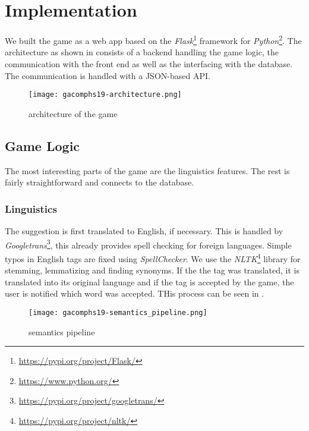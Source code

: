 \section{Implementation}
\label{gacomphs19:sec:implementation}

We built the game as a web app based on the \textit{Flask}\footnote{\url{https://pypi.org/project/Flask/}} framework for \textit{Python}\footnote{\url{https://www.python.org/}}. The architecture as shown in  consists of a backend handling the game logic, the communication with the front end as well as the interfacing with the database. The communication is handled with a JSON-based API.

\begin{figure}[!]
	\centering
	\texttt{[image: gacomphs19-architecture.png]}
	\caption{architecture of the game}
	\label{gacomphs19:fig:architecture}
\end{figure}

\subsection{Game Logic}
\label{gacomphs19:sec:implementation:game}

The most interesting parts of the game are the linguistics features. The rest is fairly straightforward and connects to the database.

\subsubsection{Linguistics}
\label{gacomphs19:sec:implementation:linguistics}
The suggestion is first translated to English, if necessary. This is handled by \textit{Googletrans}\footnote{\url{https://pypi.org/project/googletrans/}}, this already provides spell checking for foreign languages.
Simple typos in English tags are fixed using \textit{SpellChecker}. We use the \textit{NLTK}\footnote{\url{https://pypi.org/project/nltk/}} library for stemming, lemmatizing and finding synonyms. If the the tag was translated, it is translated into its original language and if the tag is accepted by the game, the user is notified which word was accepted. THis process can be seen in .

\begin{figure}[tb]
	\centering
	\texttt{[image: gacomphs19-semantics\_pipeline.png]}
	\caption{semantics pipeline}
	\label{gacomphs19:fig:semanticpipeline}
\end{figure}

